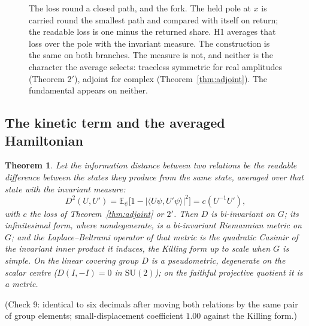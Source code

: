 \documentclass[11pt,a4paper]{article}
\theoremstyle{plain}
\newtheorem{theorem}{Theorem}
\theoremstyle{definition}
\theoremstyle{remark}
\newcommand{\E}{\mathbb{E}}
\newcommand{\SU}{\mathrm{SU}}
\begin{document}
\begin{figure}[!htbp]
\centering

\caption{The loss round a closed path, and the fork. The held pole at $x$ is carried round the smallest path and compared with itself on return; the readable loss is one minus the returned share. H1 averages that loss over the pole with the invariant measure. The construction is the same on both branches. The measure is not, and neither is the character the average selects: traceless symmetric for real amplitudes (Theorem 2$'$), adjoint for complex (Theorem~\ref{thm:adjoint}). The fundamental appears on neither.}
\label{fig:fork}
\end{figure}

\FloatBarrier
\subsection{The kinetic term and the averaged Hamiltonian}\label{sec:averaged}

\begin{theorem}\label{thm:casimir}
Let the information distance between two relations be the readable difference between the states they produce from the same state, averaged over that state with the invariant measure:
\[
D^2(U,U')=\E_\psi\big[1-|\langle U\psi,U'\psi\rangle|^2\big]=c(U^{-1}U'),
\]
with $c$ the loss of Theorem~\ref{thm:adjoint} or $2'$. Then $D$ is bi-invariant on $G$; its infinitesimal form, where nondegenerate, is a bi-invariant Riemannian metric on $G$; and the Laplace--Beltrami operator of that metric is the quadratic Casimir of the invariant inner product it induces, the Killing form up to scale when $G$ is simple. On the linear covering group $D$ is a pseudometric, degenerate on the scalar centre ($D(I,-I)=0$ in $\SU(2)$); on the faithful projective quotient it is a metric.
\end{theorem}
(Check 9: identical to six decimals after moving both relations by the same pair of group elements; small-displacement coefficient $1.00$ against the Killing form.)
\end{document}
